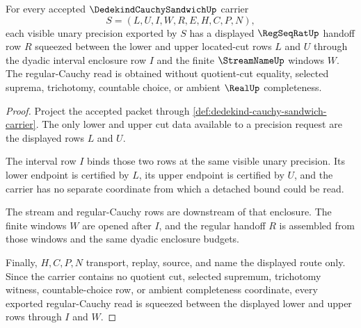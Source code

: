 \begin{theorem}
\label{thm:dedekind-cauchy-sandwich-regularization}
For every accepted $\DedekindCauchySandwichUp$ carrier
$$
S=(L,U,I,W,R,E,H,C,P,N),
$$
each visible unary precision exported by $S$ has a displayed $\RegSeqRatUp$ handoff row $R$ squeezed between the lower and upper located-cut rows $L$ and $U$ through the dyadic interval enclosure row $I$ and the finite $\StreamNameUp$ windows $W$. The regular-Cauchy read is obtained without quotient-cut equality, selected suprema, trichotomy, countable choice, or ambient $\RealUp$ completeness.
\end{theorem}
\begin{proof}
Project the accepted packet through \autoref{def:dedekind-cauchy-sandwich-carrier}. The only lower and upper cut data available to a precision request are the displayed rows $L$ and $U$.

The interval row $I$ binds those two rows at the same visible unary precision. Its lower endpoint is certified by $L$, its upper endpoint is certified by $U$, and the carrier has no separate coordinate from which a detached bound could be read.

The stream and regular-Cauchy rows are downstream of that enclosure. The finite windows $W$ are opened after $I$, and the regular handoff $R$ is assembled from those windows and the same dyadic enclosure budgets.

Finally, $H,C,P,N$ transport, replay, source, and name the displayed route only. Since the carrier contains no quotient cut, selected supremum, trichotomy witness, countable-choice row, or ambient completeness coordinate, every exported regular-Cauchy read is squeezed between the displayed lower and upper rows through $I$ and $W$.
\end{proof}

